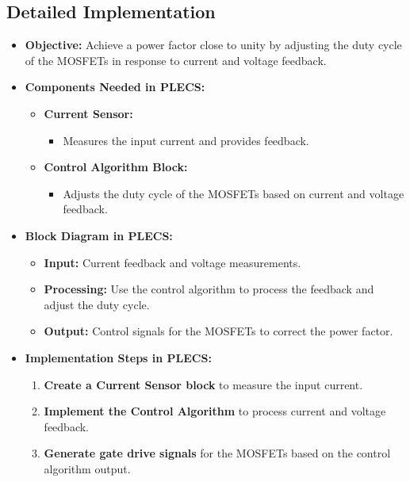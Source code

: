 \documentclass{article}
\begin{document}
\subsection{Detailed Implementation}
\begin{itemize}
    \item \textbf{Objective:} Achieve a power factor close to unity by adjusting the duty cycle of the MOSFETs in response to current and voltage feedback.
    \item \textbf{Components Needed in PLECS:}
    \begin{itemize}
        \item \textbf{Current Sensor:}
        \begin{itemize}
            \item Measures the input current and provides feedback.
        \end{itemize}
        \item \textbf{Control Algorithm Block:}
        \begin{itemize}
            \item Adjusts the duty cycle of the MOSFETs based on current and voltage feedback.
        \end{itemize}
    \end{itemize}
    \item \textbf{Block Diagram in PLECS:}
    \begin{itemize}
        \item \textbf{Input:} Current feedback and voltage measurements.
        \item \textbf{Processing:} Use the control algorithm to process the feedback and adjust the duty cycle.
        \item \textbf{Output:} Control signals for the MOSFETs to correct the power factor.
    \end{itemize}
    \item \textbf{Implementation Steps in PLECS:}
    \begin{enumerate}
        \item \textbf{Create a Current Sensor block} to measure the input current.
        \item \textbf{Implement the Control Algorithm} to process current and voltage feedback.
        \item \textbf{Generate gate drive signals} for the MOSFETs based on the control algorithm output.
    \end{enumerate}
\end{itemize}
\end{document}
